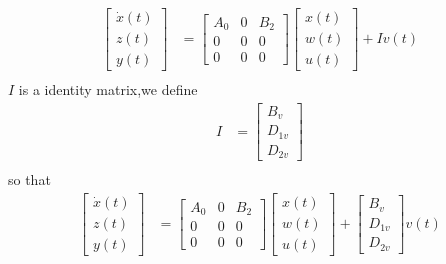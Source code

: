 \documentclass[twocolumn]{autart}    %
\begin{document}
\begin{equation}
    \begin{aligned}
        \begin{bmatrix}
            \dot{x}(t) \\
            z(t) \\
            y(t) 
        \end{bmatrix} & = \begin{bmatrix}
            A_{0} & 0 & B_{2}\\
            0 & 0 & 0\\
            0 & 0 & 0
        \end{bmatrix}\begin{bmatrix}
            x(t) \\
            w(t) \\
            u(t) 
        \end{bmatrix} + Iv(t)\\
    \end{aligned}
\end{equation}
$I$ is a identity matrix,we define
\begin{equation}
    \begin{aligned}
        I & = \begin{bmatrix}
            B_{v} \\
            D_{1v} \\
            D_{2v} 
        \end{bmatrix} \\
    \end{aligned}
\end{equation}
so that
\begin{equation}
    \begin{aligned}
        \begin{bmatrix}
            \dot{x}(t) \\
            z(t) \\
            y(t) 
        \end{bmatrix} & = \begin{bmatrix}
            A_{0} & 0 & B_{2}\\
            0 & 0 & 0\\
            0 & 0 & 0
        \end{bmatrix}\begin{bmatrix}
            x(t) \\
            w(t) \\
            u(t) 
        \end{bmatrix} + \begin{bmatrix}
            B_{v} \\
            D_{1v} \\
            D_{2v} 
        \end{bmatrix}v(t)\\
    \end{aligned}
\end{equation}
\end{document}
